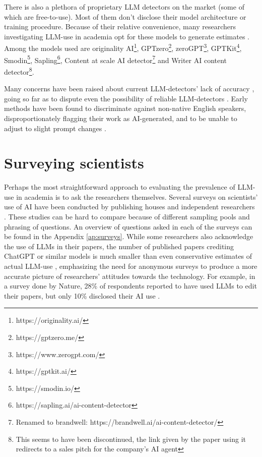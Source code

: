 There is also a plethora of proprietary LLM detectors on the market (some of which are free-to-use).
Most of them don't disclose their model architecture or training procedure.
Because of their relative convenience, many researchers investigating LLM-use in academia opt for these models to generate estimates \cite{Akram2024, Liu2024_profiles, Picazo-Sanchez2024}.
Among the models used are originality AI\footnote{https://originality.ai/}, GPTzero\footnote{https://gptzero.me/}, zeroGPT\footnote{https://www.zerogpt.com/}, GPTKit\footnote{https://gptkit.ai/}, Smodin\footnote{https://smodin.io/}, Sapling\footnote{https://sapling.ai/ai-content-detector}, Content at scale AI detector\footnote{Renamed to brandwell: https://brandwell.ai/ai-content-detector/} and Writer AI content detector\footnote{This seems to have been discontinued, the link given by the paper using it redirects to a sales pitch for the company's AI agent}.

Many concerns have been raised about current LLM-detectors' lack of accuracy \cite{Doughman2025, Lazebnik2024, Weber-Wulff2023}, going so far as to dispute even the possibility of reliable LLM-detectors \cite{Sadasivan2025}.
Early methods have been found to discriminate against non-native English speakers, disproportionately flagging their work as AI-generated, and to be unable to adjust to slight prompt changes \cite{Liang2023}.

\section{Surveying scientists}
Perhaps the most straightforward approach to evaluating the prevalence of LLM-use in academia is to ask the researchers themselves. 
Several surveys on scientists' use of AI have been conducted by publishing houses \cite{Elsevier2024, Kwon2025, Nordling2023, VanNoorden2023, Wiley2025} and independent researchers \cite{Eppler2024, Liao2024, Mishra2024, Mohammadi2026}.
These studies can be hard to compare because of different sampling pools and phrasing of questions.
An overview of questions asked in each of the surveys can be found in the Appendix \ref{ap:surveys}.
While some researchers also acknowledge the use of LLMs in their papers, the number of published papers crediting ChatGPT or similar models is much smaller than even conservative estimates of actual LLM-use \cite{Kousha2024}, emphasizing the need for anonymous surveys to produce a more accurate picture of researchers' attitudes towards the technology.
For example, in a survey done by Nature, 28\% of respondents reported to have used LLMs to edit their papers, but only 10\% disclosed their AI use \cite{Kwon2025}.
